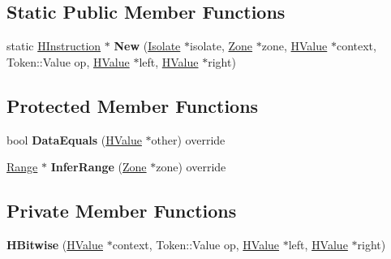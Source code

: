 \subsection*{Static Public Member Functions}
\begin{DoxyCompactItemize}
\item 
static \hyperlink{classv8_1_1internal_1_1_h_instruction}{H\+Instruction} $\ast$ {\bfseries New} (\hyperlink{classv8_1_1internal_1_1_isolate}{Isolate} $\ast$isolate, \hyperlink{classv8_1_1internal_1_1_zone}{Zone} $\ast$zone, \hyperlink{classv8_1_1internal_1_1_h_value}{H\+Value} $\ast$context, Token\+::\+Value op, \hyperlink{classv8_1_1internal_1_1_h_value}{H\+Value} $\ast$left, \hyperlink{classv8_1_1internal_1_1_h_value}{H\+Value} $\ast$right)\hypertarget{classv8_1_1internal_1_1_h_bitwise_a1d32da000fdef00631482ba0c8a47674}{}\label{classv8_1_1internal_1_1_h_bitwise_a1d32da000fdef00631482ba0c8a47674}

\end{DoxyCompactItemize}
\subsection*{Protected Member Functions}
\begin{DoxyCompactItemize}
\item 
bool {\bfseries Data\+Equals} (\hyperlink{classv8_1_1internal_1_1_h_value}{H\+Value} $\ast$other) override\hypertarget{classv8_1_1internal_1_1_h_bitwise_aa9547c4211c9e80a85b068e643e648fc}{}\label{classv8_1_1internal_1_1_h_bitwise_aa9547c4211c9e80a85b068e643e648fc}

\item 
\hyperlink{classv8_1_1internal_1_1_range}{Range} $\ast$ {\bfseries Infer\+Range} (\hyperlink{classv8_1_1internal_1_1_zone}{Zone} $\ast$zone) override\hypertarget{classv8_1_1internal_1_1_h_bitwise_a1c9630e69ff79870c96f5f269924c349}{}\label{classv8_1_1internal_1_1_h_bitwise_a1c9630e69ff79870c96f5f269924c349}

\end{DoxyCompactItemize}
\subsection*{Private Member Functions}
\begin{DoxyCompactItemize}
\item 
{\bfseries H\+Bitwise} (\hyperlink{classv8_1_1internal_1_1_h_value}{H\+Value} $\ast$context, Token\+::\+Value op, \hyperlink{classv8_1_1internal_1_1_h_value}{H\+Value} $\ast$left, \hyperlink{classv8_1_1internal_1_1_h_value}{H\+Value} $\ast$right)\hypertarget{classv8_1_1internal_1_1_h_bitwise_a54580a601fb5c33f9cfd8d798127fa83}{}\label{classv8_1_1internal_1_1_h_bitwise_a54580a601fb5c33f9cfd8d798127fa83}

\end{DoxyCompactItemize}
